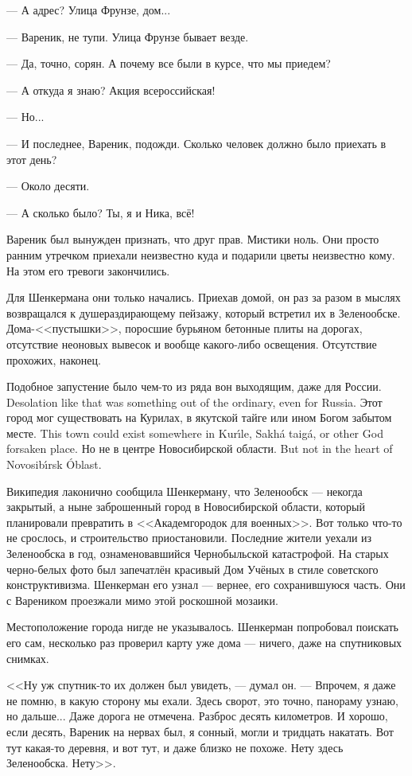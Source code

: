 --- А адрес?
Улица Фрунзе, дом...

--- Вареник, не тупи.
Улица Фрунзе бывает везде.

--- Да, точно, сорян.
А почему все были в курсе, что мы приедем?

--- А откуда я знаю?
Акция всероссийская!

--- Но...

--- И последнее, Вареник, подожди.
Сколько человек должно было приехать в этот день?

--- Около десяти.

--- А сколько было?
Ты, я и Ника, всё!

Вареник был вынужден признать, что друг прав.
Мистики ноль.
Они просто ранним утречком приехали неизвестно куда и подарили цветы неизвестно кому.
На этом его тревоги закончились.

Для Шенкермана они только начались.
Приехав домой, он раз за разом в мыслях возвращался к душераздирающему пейзажу, который встретил их в Зеленообске.
Дома-<<пустышки>>, поросшие бурьяном бетонные плиты на дорогах, отсутствие неоновых вывесок и вообще какого-либо освещения.
Отсутствие прохожих, наконец.

{Подобное запустение было чем-то из ряда вон выходящим, даже для России.}
{Desolation like that was something out of the ordinary, even for Russia.}
{Этот город мог существовать на Курилах, в якутской тайге или ином Богом забытом месте.}
{This town could exist somewhere in Kur\'{\i}le, Sakh\'a taig\'a, or other God forsaken place.}
{Но не в центре Новосибирской области.}
{But not in the heart of Novosib\'{\i}rsk \'Oblast.}

Википедия лаконично сообщила Шенкерману, что Зеленообск --- некогда закрытый, а ныне заброшенный город в Новосибирской области, который планировали превратить в <<Академгородок для военных>>.
Вот только что-то не срослось, и строительство приостановили.
Последние жители уехали из Зеленообска в год, ознаменовавшийся Чернобыльской катастрофой.
На старых черно-белых фото был запечатлён красивый Дом Учёных в стиле советского конструктивизма.
Шенкерман его узнал --- вернее, его сохранившуюся часть.
Они с Вареником проезжали мимо этой роскошной мозаики.

Местоположение города нигде не указывалось.
Шенкерман попробовал поискать его сам, несколько раз проверил карту уже дома --- ничего, даже на спутниковых снимках.

<<Ну уж спутник-то их должен был увидеть, --- думал он.
--- Впрочем, я даже не помню, в какую сторону мы ехали.
Здесь сворот, это точно, панораму узнаю, но дальше...
Даже дорога не отмечена.
Разброс десять километров.
И хорошо, если десять, Вареник на нервах был, я сонный, могли и тридцать накатать.
Вот тут какая-то деревня, и вот тут, и даже близко не похоже.
Нету здесь Зеленообска.
Нету>>.

